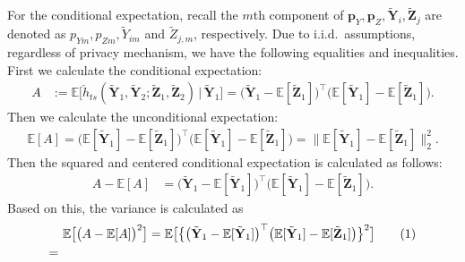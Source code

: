 \documentclass[twoside,11pt]{article}
\newcommand\numberthis{\addtocounter{equation}{1}\tag{\theequation}}
\newcommand{\rvTwo}{Y}
\newcommand{\rvThree}{Z}
\newcommand{\vectorize}[1]{\mathbf{#1}}
\newcommand{\mE}{\mathbb{E}} %
\newcommand{\sampleIndexOne}{i}
\newcommand{\sampleIndexTwo}{j}
\newcommand{\vectorIndex}{m}
\newcommand{\probVecElement}[2]{p_{{#1}{#2}}}
\newcommand{\probVec}{\mathbf{p}} %
\newcommand{\kernelTwoSampleSym}{\check{h}_{ts}}
\begin{document}
\begin{appendix}
	For the conditional expectation, recall
	the $\vectorIndex$th component of
	$\probVec_\rvTwo, \probVec_\rvThree,
	\tilde{\vectorize{\rvTwo}}_{\sampleIndexOne},
	\tilde{\vectorize{\rvThree}}_{\sampleIndexTwo}$
	are denoted as
	$
	\probVecElement{\rvTwo}{\vectorIndex},
	\probVecElement{\rvThree}{\vectorIndex},
	\tilde{\rvTwo}_{\sampleIndexOne \vectorIndex}$
	and $\tilde{\rvThree}_{\sampleIndexTwo, \vectorIndex}$,
	respectively.
	Due to i.i.d.~assumptions, regardless of privacy mechanism, we have the following equalities and inequalities.
	First we calculate the conditional expectation:
	\begin{align*}
		A&:=
		\mE
		\bigl[
		\kernelTwoSampleSym(
		\tilde{\vectorize{\rvTwo}}_1,
		\tilde{\vectorize{\rvTwo}}_2
		;
		\tilde{\vectorize{\rvThree}}_1,
		\tilde{\vectorize{\rvThree}}_2)
		\,|\,
		\tilde{\vectorize{\rvTwo}}_1
		\bigr]
		=
		\bigl(
		\tilde{\vectorize{\rvTwo}}_1 - \mE [ \tilde{\vectorize{\rvThree}}_{1}]
		\bigr)^\top
		\bigl(
		\mE [ \tilde{\vectorize{\rvTwo}}_{1}] - \mE [ \tilde{\vectorize{\rvThree}}_{1}]
		\bigr).
	\end{align*}
	Then we calculate the unconditional expectation:
	\begin{align*}
		\mE[A]
		=
		\bigl(
		\mE [ \tilde{\vectorize{\rvTwo}}_{1}]  - \mE [ \tilde{\vectorize{\rvThree}}_{1}]
		\bigr)^\top
		\bigl(
		\mE [ \tilde{\vectorize{\rvTwo}}_{1}] - \mE [ \tilde{\vectorize{\rvThree}}_{1}]
		\bigr)
		=
		\|\mE [ \tilde{\vectorize{\rvTwo}}_{1}]
		-
		\mE [ \tilde{\vectorize{\rvThree}}_{1}]
		\|_2^2.
	\end{align*}
	Then the squared and centered conditional expectation is calculated as follows:
	\begin{align*}
		A - \mE[A]
		&=
		\bigl(
		\tilde{\vectorize{\rvTwo}}_1 - \mE [ \tilde{\vectorize{\rvTwo}}_{1}]
		\bigr)^\top
		\bigl(
		\mE [ \tilde{\vectorize{\rvTwo}}_{1}] - \mE [ \tilde{\vectorize{\rvThree}}_{1}]
		\bigr).
	\end{align*}
	Based on this, the variance is calculated as
	\begin{align*}
		& \mE
		\bigl[
		\bigl(
		A - \mE[A]
		\bigr)^2
		\bigr]
		=
		\mE
		\bigl[
		\bigl\{
		\bigl(
		\tilde{\vectorize{\rvTwo}}_1 - \mE [ \tilde{\vectorize{\rvTwo}}_{1}]
		\bigr)^\top
		\bigl(
		\mE [ \tilde{\vectorize{\rvTwo}}_{1}] - \mE [ \tilde{\vectorize{\rvThree}}_{1}]
		\bigr)
		\bigr\}^2
		\bigr]
		\numberthis \label{appendix:equation:multinomial:upper:forrappor}
		\\
		= ~ &

\end{align*}
\end{appendix}
\end{document}

